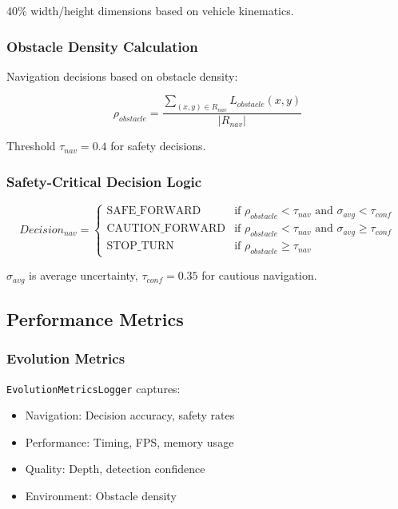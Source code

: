 \documentclass[12pt,oneside]{book}
\begin{document}
40\% width/height dimensions based on vehicle kinematics.

\subsubsection{Obstacle Density Calculation}

Navigation decisions based on obstacle density:

\begin{equation}
\rho_{obstacle} = \frac{\sum_{(x,y) \in R_{nav}} L_{obstacle}(x,y)}{|R_{nav}|}
\label{eq:obstacle_density_detailed}
\end{equation}

Threshold $\tau_{nav} = 0.4$ for safety decisions.

\subsubsection{Safety-Critical Decision Logic}

\begin{equation}
Decision_{nav} = \begin{cases}
\text{SAFE\_FORWARD} & \text{if } \rho_{obstacle} < \tau_{nav} \text{ and } \sigma_{avg} < \tau_{conf} \\
\text{CAUTION\_FORWARD} & \text{if } \rho_{obstacle} < \tau_{nav} \text{ and } \sigma_{avg} \geq \tau_{conf} \\
\text{STOP\_TURN} & \text{if } \rho_{obstacle} \geq \tau_{nav}
\end{cases}
\label{eq:navigation_decision_detailed}
\end{equation}

$\sigma_{avg}$ is average uncertainty, $\tau_{conf} = 0.35$ for cautious navigation.

\subsection{Performance Metrics}

\subsubsection{Evolution Metrics}

\texttt{EvolutionMetricsLogger} captures:
\begin{itemize}
\item Navigation: Decision accuracy, safety rates
\item Performance: Timing, FPS, memory usage
\item Quality: Depth, detection confidence
\item Environment: Obstacle density
\end{itemize}
\end{document}
